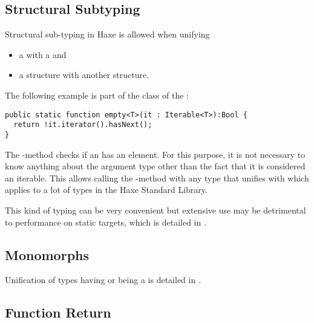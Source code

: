 \subsection{Structural Subtyping}
\label{type-system-structural-subtyping}


Structural sub-typing in Haxe is allowed when unifying

\begin{itemize}
	\item a  with a  and
	\item a structure with another structure.
\end{itemize}

The following example is part of the  class of the :

\begin{lstlisting}
public static function empty<T>(it : Iterable<T>):Bool {
  return !it.iterator().hasNext();
}
\end{lstlisting}
The -method checks if an  has an element. For this purpose, it is not necessary to know anything about the argument type other than the fact that it is considered an iterable. This allows calling the -method with any type that unifies with  which applies to a lot of types in the Haxe Standard Library.

This kind of typing can be very convenient but extensive use may be detrimental to performance on static targets, which  is detailed in .


\subsection{Monomorphs}
\label{type-system-monomorphs}

Unification of types having or being a  is detailed in .


\subsection{Function Return}
\label{type-system-unification-function-return}

